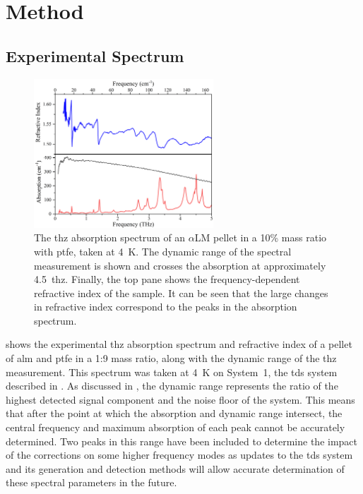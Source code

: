 \section{Method}
\subsection{Experimental Spectrum}
\begin{figure}[bh!]
    \centering
    \includegraphics[width=0.6\textwidth]{Figures/Spectra/AbsRefInd.png}
    \captionsetup{font = footnotesize, justification = centering}
    \caption[The THz Absorption Spectrum and Refractive Index of \(\alpha\)-Lactose Monohydrate]{The \acrshort{thz} absorption spectrum of an ${\alpha}$LM pellet in a 10\% mass ratio with \acrshort{ptfe}, taken at \SI{4}{K}. The dynamic range of the spectral measurement is shown and crosses the absorption at approximately \SI{4.5}{\acrshort{thz}}. Finally, the top pane shows the frequency\nobreakdash-dependent refractive index of the sample. It can be seen that the large changes in refractive index correspond to the peaks in the absorption spectrum.}
    \label{fig:AbsRefInd}
\end{figure}

 shows the experimental \acrshort{thz} absorption spectrum and refractive index of a pellet of \acrshort{alm} and \acrshort{ptfe} in a 1:9 mass ratio, along with the dynamic range of the \acrshort{thz} measurement. This spectrum was taken at \SI{4}{K} on  System~1, the \acrshort{tds} system described in . As discussed in , the dynamic range represents the ratio of the highest detected signal component and the noise floor of the system. This means that after the point at which the absorption and dynamic range intersect, the central frequency and maximum absorption of each peak cannot be accurately determined. Two peaks in this range have been included to determine the impact of the corrections on some higher frequency modes as updates to the \acrshort{tds} system and its generation and detection methods will allow accurate determination of these spectral parameters in the future. 

